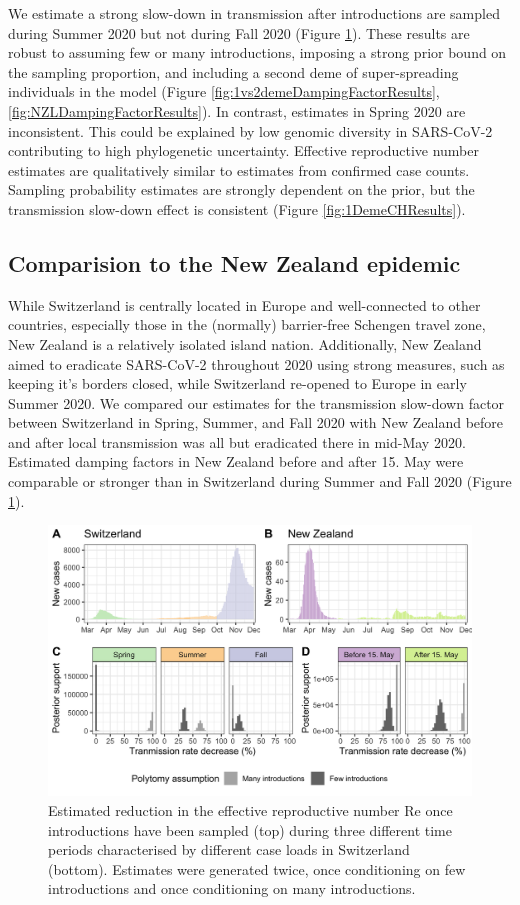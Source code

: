 \documentclass[9pt,twoside,lineno]{pnas-new} %
\begin{document}
We estimate a strong slow-down in transmission after introductions are sampled during Summer 2020 but not during Fall 2020 (Figure \ref{fig:scale-factor}). These results are robust to assuming few or many introductions, imposing a strong prior bound on the sampling proportion, and including a second deme of super-spreading individuals in the model (Figure \ref{fig:1vs2demeDampingFactorResults}, \ref{fig:NZLDampingFactorResults}). In contrast, estimates in Spring 2020 are inconsistent. This could be explained by low genomic diversity in SARS-CoV-2 contributing to high phylogenetic uncertainty. Effective reproductive number estimates are qualitatively similar to estimates from confirmed case counts. Sampling probability estimates are strongly dependent on the prior, but the transmission slow-down effect is consistent (Figure \ref{fig:1DemeCHResults}).

\subsection{Comparision to the New Zealand epidemic}
While Switzerland is centrally located in Europe and well-connected to other countries, especially those in the (normally) barrier-free Schengen travel zone, New Zealand is a relatively isolated island nation. Additionally, New Zealand aimed to eradicate SARS-CoV-2 throughout 2020 using strong measures, such as keeping it's borders closed, while Switzerland re-opened to Europe in early Summer 2020. We compared our estimates for the transmission slow-down factor between Switzerland in Spring, Summer, and Fall 2020 with New Zealand before and after local transmission was all but eradicated there in mid-May 2020. Estimated damping factors in New Zealand before and after 15. May were comparable or stronger than in Switzerland during Summer and Fall 2020 (Figure \ref{fig:scale-factor}).

\begin{figure}[H]
\centering
\includegraphics[width=\linewidth]{figures/contact_tracing_factors_no_sampUB_compared_to_cases.png}
\caption{Estimated reduction in the effective reproductive number Re once introductions have been sampled (top) during three different time periods characterised by different case loads in Switzerland (bottom). Estimates were generated twice, once conditioning on few introductions and once conditioning on many introductions.}  
\label{fig:scale-factor}
\end{figure}
\end{document}
